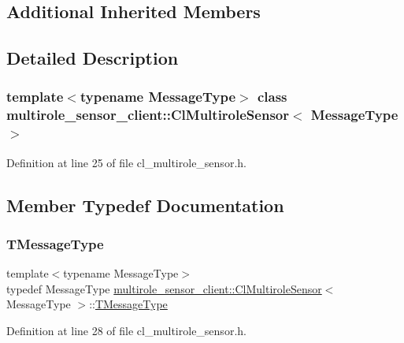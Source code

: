\subsection*{Additional Inherited Members}


\subsection{Detailed Description}
\subsubsection*{template$<$typename Message\+Type$>$\newline
class multirole\+\_\+sensor\+\_\+client\+::\+Cl\+Multirole\+Sensor$<$ Message\+Type $>$}



Definition at line 25 of file cl\+\_\+multirole\+\_\+sensor.\+h.



\subsection{Member Typedef Documentation}
\mbox{\label{classmultirole__sensor__client_1_1ClMultiroleSensor_af6273a0b7c896dad766130706984071f}} 
\subsubsection{\texorpdfstring{T\+Message\+Type}{TMessageType}}
{\footnotesize\ttfamily template$<$typename Message\+Type$>$ \\
typedef Message\+Type \hyperlink{classmultirole__sensor__client_1_1ClMultiroleSensor}{multirole\+\_\+sensor\+\_\+client\+::\+Cl\+Multirole\+Sensor}$<$ Message\+Type $>$\+::\hyperlink{classsmacc_1_1client__bases_1_1SmaccSubscriberClient_a61d798bda71bf335d72e61928ca561b0}{T\+Message\+Type}}



Definition at line 28 of file cl\+\_\+multirole\+\_\+sensor.\+h.



